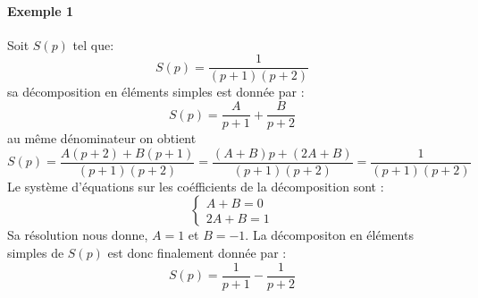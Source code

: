\paragraph{Exemple 1}
Soit $S(p)$ tel que:
$$
S(p)=\dfrac{1}{(p+1)(p+2)}
$$
sa décomposition en éléments simples est donnée par :
$$
S(p)=\dfrac{A}{p+1}+\dfrac{B}{p+2}
$$
au même dénominateur on obtient
$$
S(p)=\dfrac{A(p+2)+B(p+1)}{(p+1)(p+2)}=\dfrac{(A+B)p+(2A+B)}{(p+1)(p+2)}=\dfrac{1}{(p+1)(p+2)}
$$
Le système d'équations sur les coéfficients de la décomposition sont :
$$
\begin{cases}
    A+B=0\\
    2A+B=1
\end{cases}
$$
Sa résolution nous donne, $A=1$ et $B=-1$.
La décompositon en éléments simples de $S(p)$ est donc finalement donnée par :
$$
S(p)=\dfrac{1}{p+1}-\dfrac{1}{p+2}
$$


